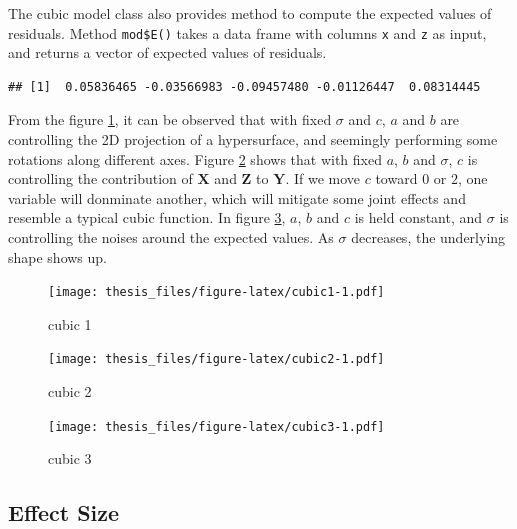 \documentclass{monashthesis}
\begin{document}
The cubic model class also provides method to compute the expected values of residuals. Method \texttt{mod\$E()} takes a data frame with columns \texttt{x} and \texttt{z} as input, and returns a vector of expected values of residuals.

\begin{Shaded}
\begin{Highlighting}[]
\SpecialCharTok{$}\SpecialCharTok{$}\NormalTok{(} \NormalTok{))}
\end{Highlighting}
\end{Shaded}

\begin{verbatim}
## [1]  0.05836465 -0.03566983 -0.09457480 -0.01126447  0.08314445
\end{verbatim}

From the figure \ref{fig:cubic1}, it can be observed that with fixed \(\sigma\) and \(c\), \(a\) and \(b\) are controlling the 2D projection of a hypersurface, and seemingly performing some rotations along different axes. Figure \ref{fig:cubic2} shows that with fixed \(a\), \(b\) and \(\sigma\), \(c\) is controlling the contribution of \(\boldsymbol{X}\) and \(\boldsymbol{Z}\) to \(\boldsymbol{Y}\). If we move \(c\) toward \(0\) or \(2\), one variable will donminate another, which will mitigate some joint effects and resemble a typical cubic function. In figure \ref{fig:cubic3}, \(a\), \(b\) and \(c\) is held constant, and \(\sigma\) is controlling the noises around the expected values. As \(\sigma\) decreases, the underlying shape shows up.

\begin{figure}
\centering
\texttt{[image: thesis\_files/figure-latex/cubic1-1.pdf]}
\caption{\label{fig:cubic1}cubic 1}
\end{figure}

\begin{figure}
\centering
\texttt{[image: thesis\_files/figure-latex/cubic2-1.pdf]}
\caption{\label{fig:cubic2}cubic 2}
\end{figure}

\begin{figure}
\centering
\texttt{[image: thesis\_files/figure-latex/cubic3-1.pdf]}
\caption{\label{fig:cubic3}cubic 3}
\end{figure}

\hypertarget{effect-size}{%
\subsection{Effect Size}\label{effect-size}}
\end{document}
